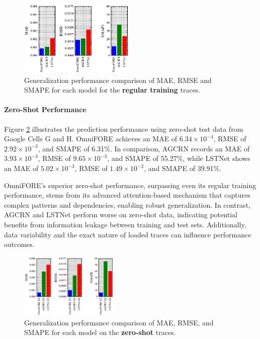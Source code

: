 \documentclass{ieeetmlcn}
\begin{document}
\begin{figure}\centering%
\centering
\includegraphics[width=0.49\textwidth]{img/metrics_comparison_regular.eps}
\caption{Generalization performance comparison of MAE, RMSE and SMAPE for each model for the \textbf{regular training} traces.}
\label{fig:metrics_comparison_regular}
\end{figure}

\paragraph*{Zero-Shot Performance}
Figure \ref{fig:metrics_comparison_ZS} illustrates the prediction performance using zero-shot test data from Google Cells G and H. OmniFORE achieves an MAE of $6.34 \times 10^{-4}$, RMSE of $2.92 \times 10^{-3}$, and SMAPE of 6.31\%. In comparison, AGCRN records an MAE of $3.93 \times 10^{-3}$, RMSE of $9.65 \times 10^{-3}$, and SMAPE of 55.27\%, while LSTNet shows an MAE of $5.02 \times 10^{-3}$, RMSE of $1.49 \times 10^{-2}$, and SMAPE of 39.91\%.

OmniFORE's superior zero-shot performance, surpassing even its regular training performance, stems from its advanced attention-based mechanism that captures complex patterns and dependencies, enabling robust generalization. In contrast, AGCRN and LSTNet perform worse on zero-shot data, indicating potential benefits from information leakage between training and test sets. Additionally, data variability and the exact nature of loaded traces can influence performance outcomes.

\begin{figure}\centering%
\centering
\includegraphics[width=0.42\textwidth]{img/metrics_comparison_zs.eps}
\caption{Generalization performance comparison of MAE, RMSE, and SMAPE for each model on the \textbf{zero-shot} traces.}
\label{fig:metrics_comparison_ZS}
\end{figure}
\end{document}
